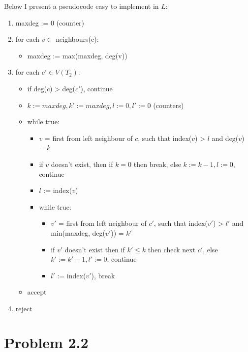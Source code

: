 \documentclass[11pt]{article}
\begin{document}
Below I present a pseudocode easy to implement in $L$:
\begin{enumerate}
    \item maxdeg := 0 (counter)
    \item for each $v \in$ neighbours(c):
        \begin{itemize}
            \item maxdeg := max(maxdeg, deg(v))
        \end{itemize}
    \item for each $c' \in V(T_2)$:
        \begin{itemize}
            \item if deg($c$) > deg($c'$), continue
            \item $k := maxdeg, k' := maxdeg, l := 0, l' := 0$ (counters)
            \item while true:
                \begin{itemize}
                    \item $v$ = first from left neighbour of $c$, such that
                        index($v$) > $l$ and deg($v$) = $k$
                    \item if $v$ doesn't exist, then if $k=0$ then break, else
                        $k := k - 1, l := 0$, continue
                    \item $l$ := index($v$)
                    \item while true:
                        \begin{itemize}
                            \item $v'$ = first from left neighbour of $c'$, such
                                that index($v'$) > $l'$ and min(maxdeg,
                                deg($v'$)) = $k'$
                            \item if $v'$ doesn't exist then if $k' \le k$ then
                                check next $c'$, else $k' := k' - 1, l' := 0$,
                                continue
                            \item $l'$ := index($v'$), break
                        \end{itemize}
                \end{itemize}
            \item accept
        \end{itemize}
    \item reject
\end{enumerate}

\section{Problem 2.2}
\end{document}
